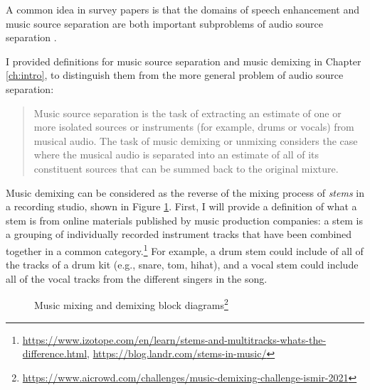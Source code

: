 \documentclass[report.tex]{subfiles}
\begin{document}
A common idea in survey papers is that the domains of speech enhancement and music source separation are both important subproblems of audio source separation \parencite{musicsepintro1, musicmask}.

I provided definitions for music source separation and music demixing in Chapter \ref{ch:intro}, to distinguish them from the more general problem of audio source separation:

\begin{quote}
Music source separation is the task of extracting an estimate of one or more isolated sources or instruments (for example, drums or vocals) from musical audio. The task of music demixing or unmixing considers the case where the musical audio is separated into an estimate of all of its constituent sources that can be summed back to the original mixture.
\end{quote}

Music demixing can be considered as the reverse of the mixing process of \textit{stems} in a recording studio, shown in Figure \ref{fig:mixingdiagrams}. First, I will provide a definition of what a stem is from online materials published by music production companies: a stem is a grouping of individually recorded instrument tracks that have been combined together in a common category.\footnote{\url{https://www.izotope.com/en/learn/stems-and-multitracks-whats-the-difference.html}, \url{https://blog.landr.com/stems-in-music/}} For example, a drum stem could include of all of the tracks of a drum kit (e.g., snare, tom, hihat), and a vocal stem could include all of the vocal tracks from the different singers in the song.

\begin{figure}[ht]
	\centering
        \begin{minipage}{1.\textwidth}
		\renewcommand\footnoterule{} %
		\renewcommand{\thempfootnote}{\fnsymbol{mpfootnote}}
		\centering
		\caption[Music mixing and demixing block diagrams]{Music mixing and demixing block diagrams\footnote{\url{https://www.aicrowd.com/challenges/music-demixing-challenge-ismir-2021}}}
		\label{fig:mixingdiagrams}
	\end{minipage}
\end{figure}
\end{document}
